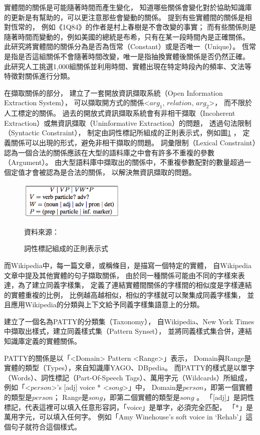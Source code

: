 實體間的關係是可能隨著時間而產生變化，
知道哪些關係會變化對於協助知識庫的更新是有幫助的，可以更注意那些會變動的關係。
\cite{relationsByTime} 提到有些實體間的關係是相對恆常的，
例如《1Q84》的作者是村上春樹是不會改變的事實；
而有些關係則是隨著時間而變動的，例如美國的總統是布希，只有在某一段時間內是正確關係。
此研究將實體間的關係分為是否為恆常（Constant）或是否唯一（Unique）。
恆常是指是否這組關係不會隨著時間改變，唯一是指抽換實體後關係是否仍然正確。
此研究人工挑選1,000組關係並利用時間、實體出現在特定時段內的頻率、文法等特徵對關係進行分類。

在擷取關係的部分，
\cite{reverb} 建立了一套開放資訊擷取系統（Open Information Extraction System），
可以擷取開方式的關係<$arg_1$, $relation$, $arg_2$>，
而不限於人工標定的關係。
過去的開放式資訊擷取系統會有非相干擷取（Incoherent Extraction）或無資訊擷取（Uninformative Extraction）的問題，
透過句法限制（Syntactic Constraint），
制定由詞性標記所組成的正則表示式，例如圖\ref{i:reverb-pos} ，
定義關係可以出現的形式，避免非相干擷取的問題。
詞彙限制（Lexical Constraint）認為一個合法的關係應該在大型的語料庫之中會有許多不重複的參數（Argument）。
由大型語料庫中擷取出的關係中，不重複參數配對的數量超過一個定值才會被認為是合法的關係，
以解決無資訊擷取的問題。

\begin{figure}
    \centering
    \includegraphics[width=0.45\textwidth]{images/02-reverb-pos}
    \caption{詞性標記組成的正則表示式}
    資料來源：\cite{reverb}
    \label{i:reverb-pos}
\end{figure}

而Wikipedia中，每一篇文章，或稱條目，是描寫一個特定的實體，
\cite{wisenet} 自Wikipedia文章中提及其他實體的句子擷取關係，
由於同一種關係可能由不同的字樣來表達，為了建立同義字樣集，
定義了連結實體間關係的字樣間的相似度是字樣連結的實體重複的比例，
比例越高越相似，相似的字樣就可以聚集成同義字樣集，
並且應用Wikipedia的分類與上下文給予同義字樣集語意上的分類。

\cite{patty,patty2012}建立了一個名為PATTY的分類集（Taxonomy），
自Wikipedia、New York Times中擷取出樣式，建立同義樣式集（Pattern Synset），
並將同義樣式集合併，連結知識庫定義的實體關係。

PATTY的關係是以「<Domain> Pattern <Range>」表示，
Domain與Range是實體的類型（Types），來自知識庫YAGO、DBpedia。
而PATTY的樣式是以單字（Words）、詞性標記（Part-Of-Speech Tags）、萬用字元（Wildcards）所組成，
例如「<$person$>'s [adj] voice * <$song$>」中，
Domain是$person$，即第一個實體的類型是$person$；
Range是$song$，即第二個實體的類型是$song$ 。
「[adj]」是詞性標記，代表這裡可以填入任意形容詞，「voice」是單字，必須完全匹配，
「*」是萬用字元，可以填入任何字。
例如「Amy Winehouse's soft voice in `Rehab'」這個句子就符合這個樣式。


